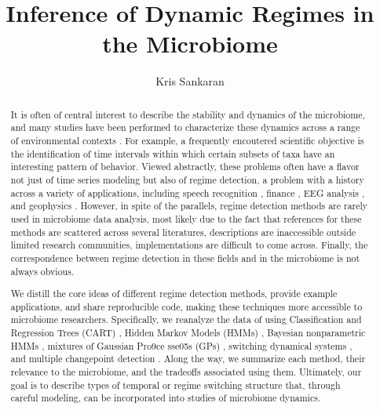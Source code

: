 \documentclass{article}
\title{Inference of Dynamic Regimes in the Microbiome}
\author{Kris Sankaran}
\begin{document}
\maketitle

\begin{abstract}
It is often of central interest to describe the stability and dynamics of the
microbiome, and many studies have been performed to characterize these dynamics
across a range of environmental contexts \citep{costello2012application,
  stein2013ecological, faust2015metagenomics}. For example, a frequently
encoutered scientific objective is the identification of time intervals within
which certain subsets of taxa have an interesting pattern of behavior. Viewed
abstractly, these problems often have a flavor not just of time series modeling
but also of regime detection, a problem with a history across a variety of
applications, including speech recognition \citep{fox2011sticky}, finance
\citep{lee2009optimal}, EEG analysis \citep{camilleri2014automatic}, and
geophysics \citep{weatherley2002relationship}. However, in spite of the
parallels, regime detection methods are rarely used in microbiome data analysis,
most likely due to the fact that references for these methods are scattered
across several literatures, descriptions are inaccessible outside limited
research communities, implementations are difficult to come across. Finally, the
correspondence between regime detection in these fields and in the microbiome is
not always obvious.

We distill the core ideas of different regime detection methods, provide example
applications, and share reproducible code, making these techniques more
accessible to microbiome researchers. Specifically, we reanalyze the data of
\citep{dethlefsen2011incomplete} using Classification and Regression Trees
(CART) \citep{breiman1984classification}, Hidden Markov Models (HMMs)
\citep{rabiner1986introduction}, Bayesian nonparametric HMMs
\citep{teh2010hierarchical}, mixtures of Gaussian Pro9ce
sse05s (GPs)
\citep{rasmussen2002infinite}, switching dynamical systems
\citep{fox2009sharing}, and multiple changepoint detection
\citep{fan2015empirical}. Along the way, we summarize each method, their
relevance to the microbiome, and the tradeoffs associated using them.
Ultimately, our goal is to describe types of temporal or regime switching
structure that, through careful modeling, can be incorporated into studies of
microbiome dynamics.
\end{abstract}
\end{document}
